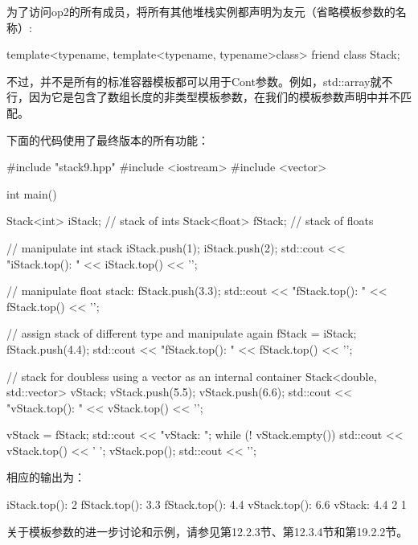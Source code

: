为了访问op2的所有成员，将所有其他堆栈实例都声明为友元（省略模板参数的名称）:

\begin{cpp}
template<typename, template<typename, typename>class>
friend class Stack;
\end{cpp}

不过，并不是所有的标准容器模板都可以用于Cont参数。例如，std::array就不行，因为它是包含了数组长度的非类型模板参数，在我们的模板参数声明中并不匹配。

下面的代码使用了最终版本的所有功能：

\begin{cpp}
#include "stack9.hpp"
#include <iostream>
#include <vector>

int main()
{
	Stack<int> iStack; // stack of ints
	Stack<float> fStack; // stack of floats
	
	// manipulate int stack
	iStack.push(1);
	iStack.push(2);
	std::cout << "iStack.top(): " << iStack.top() << '\n';
	
	// manipulate float stack:
	fStack.push(3.3);
	std::cout << "fStack.top(): " << fStack.top() << '\n';
	
	// assign stack of different type and manipulate again
	fStack = iStack;
	fStack.push(4.4);
	std::cout << "fStack.top(): " << fStack.top() << '\n';
	
	// stack for doubless using a vector as an internal container
	Stack<double, std::vector> vStack;
	vStack.push(5.5);
	vStack.push(6.6);
	std::cout << "vStack.top(): " << vStack.top() << '\n';
	
	vStack = fStack;
	std::cout << "vStack: ";
	while (! vStack.empty()) {
		std::cout << vStack.top() << ' ';
		vStack.pop();
	}
	std::cout << '\n';
}
\end{cpp}

相应的输出为：

\begin{shell}
iStack.top(): 2
fStack.top(): 3.3
fStack.top(): 4.4
vStack.top(): 6.6
vStack: 4.4 2 1
\end{shell}

关于模板参数的进一步讨论和示例，请参见第12.2.3节、第12.3.4节和第19.2.2节。





















